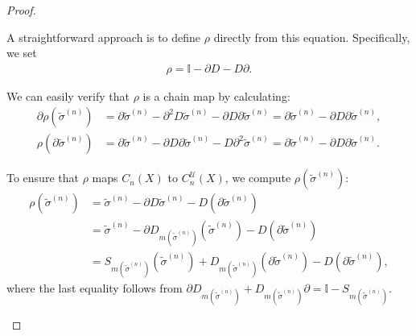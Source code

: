 \begin{proof}
\begin{enumerate}
	A straightforward approach is to define \( \rho \) directly from this equation. Specifically, we set
	\begin{align}
		\rho = \mathbb{I} - \partial D - D \partial. 
	\end{align}
		
	We can easily verify that \( \rho \) is a chain map by calculating:
	\begin{align}
		\partial \rho(\tilde{\sigma}^{(n)}) & = \partial \tilde{\sigma}^{(n)} - \partial^2 D\tilde{\sigma}^{(n)} - \partial D \partial \tilde{\sigma}^{(n)} = \partial \tilde{\sigma}^{(n)} - \partial D \partial \tilde{\sigma}^{(n)},  \\
		\rho(\partial \tilde{\sigma}^{(n)}) & = \partial \tilde{\sigma}^{(n)} - \partial D \partial \tilde{\sigma}^{(n)} - D \partial^2 \tilde{\sigma}^{(n)} = \partial \tilde{\sigma}^{(n)} - \partial D \partial \tilde{\sigma}^{(n)}. 
	\end{align}
		
	To ensure that \( \rho \) maps \( C_n(X) \) to \( C_n^{\mathcal{U}}(X) \), we compute \( \rho(\tilde{\sigma}^{(n)}) \):
	\begin{align}
		\rho(\tilde{\sigma}^{(n)}) & = \tilde{\sigma}^{(n)} - \partial D\tilde{\sigma}^{(n)} - D(\partial \tilde{\sigma}^{(n)}) \nonumber                                                 \\
		                           & = \tilde{\sigma}^{(n)} - \partial D_{m(\tilde{\sigma}^{(n)})}(\tilde{\sigma}^{(n)}) - D(\partial \tilde{\sigma}^{(n)}) \nonumber                     \\
		                           & = S_{m(\tilde{\sigma}^{(n)})}(\tilde{\sigma}^{(n)}) + D_{m(\tilde{\sigma}^{(n)})}(\partial \tilde{\sigma}^{(n)}) - D(\partial \tilde{\sigma}^{(n)}), 
	\end{align}
	where the last equality follows from \( \partial D_{m(\tilde{\sigma}^{(n)})} + D_{m(\tilde{\sigma}^{(n)})} \partial = \mathbb{I} - S_{m(\tilde{\sigma}^{(n)})} \).
		

\end{enumerate}
\end{proof}
